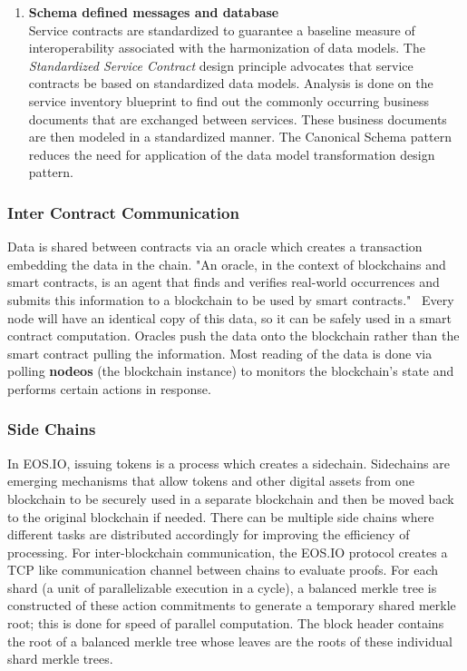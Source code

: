 \documentclass[]{article}
\begin{document}
\begin{enumerate}
	\item \textbf{Schema defined messages and database} \\
	Service contracts are standardized to guarantee a baseline measure of interoperability associated with the harmonization of data models.
	The \textit{Standardized Service Contract} design principle advocates that service contracts be based on standardized data models. 
	Analysis is done on the service inventory blueprint to find out the commonly occurring business documents that are exchanged between services. 
	These business documents are then modeled in a standardized manner. 
	The Canonical Schema pattern reduces the need for application of the data model transformation design pattern.
	\cite{1}
	
		
\end{enumerate}
	 
	\subsubsection{Inter Contract Communication}
	Data is shared between contracts via an oracle which creates a transaction embedding the data in the chain. 
	"An oracle, in the context of blockchains and smart contracts, is an agent that finds and verifies real-world occurrences 
	and submits this information to a blockchain to be used by smart contracts."\ 
	\cite{2}
	Every node will have an identical copy of this data, so it can be safely used in a smart contract computation.
	Oracles push the data onto the blockchain rather than the smart contract pulling the information.
	Most reading of the data is done via polling \textbf{nodeos} (the blockchain instance) to monitors the blockchain's state 
	and performs certain actions in response. 
	
	
	\subsubsection{Side Chains}
	In EOS.IO, issuing tokens is a process which creates a sidechain. 
	Sidechains are emerging mechanisms that allow tokens and other digital assets from one blockchain 
	to be securely used in a separate blockchain and then be moved back to the original blockchain if needed. 
	There can be multiple side chains where different tasks are distributed accordingly for improving the efficiency of processing. 	
	For inter-blockchain communication, the EOS.IO protocol creates a TCP like communication channel between chains to evaluate proofs.
	For each shard (a unit of parallelizable execution in a cycle), a balanced merkle tree is constructed of these action commitments 
	to generate a temporary shared merkle root; 
	this is done for speed of parallel computation. 
	The block header contains the root of a balanced merkle tree whose leaves are the roots of these individual shard merkle trees.
	\cite{3} 
\end{document}
